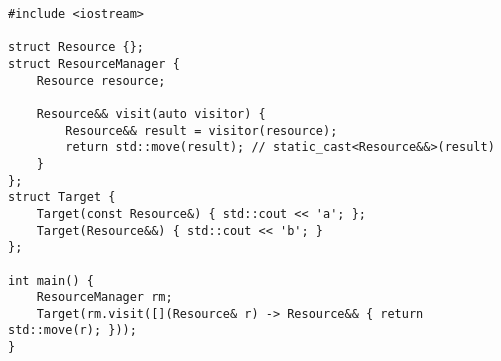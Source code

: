 \begin{lstlisting}[title=\href{https://godbolt.org/z/T91Tbq}{\texttt{godbolt.org/z/T91Tbq}}]
#include <iostream>

struct Resource {};
struct ResourceManager {
    Resource resource;

    Resource&& visit(auto visitor) {
        Resource&& result = visitor(resource);
        return std::move(result); // static_cast<Resource&&>(result)
    }
};
struct Target {
    Target(const Resource&) { std::cout << 'a'; };
    Target(Resource&&) { std::cout << 'b'; }
};

int main() {
    ResourceManager rm;
    Target(rm.visit([](Resource& r) -> Resource&& { return std::move(r); }));
}
\end{lstlisting}
